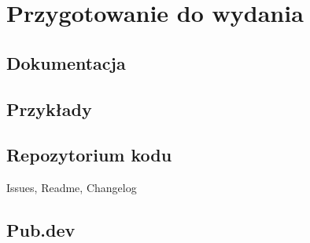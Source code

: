 \section{Przygotowanie do wydania}

\subsection{Dokumentacja}
\subsection{Przykłady}
\subsection{Repozytorium kodu}
Issues, Readme, Changelog

\subsection{Pub.dev}
